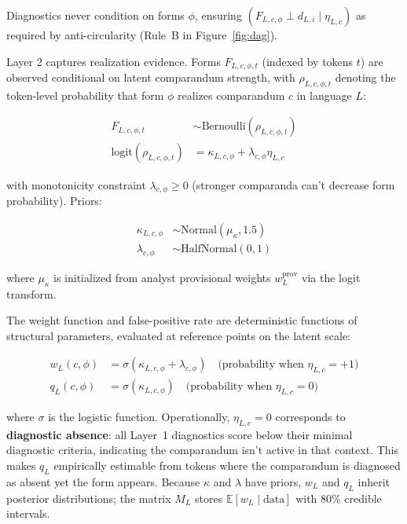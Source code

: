 \documentclass[12pt]{article}
\begin{document}
Diagnostics never condition on forms $\phi$, ensuring $(F_{L,c,\phi} \perp d_{L,i} \mid \eta_{L,c})$ as required by anti-circularity (Rule~B in Figure~\ref{fig:dag}).

Layer 2 captures realization evidence. Forms $F_{L,c,\phi,t}$ (indexed by tokens $t$) are observed conditional on latent comparandum strength, with $\rho_{L,c,\phi,t}$ denoting the token-level probability that form $\phi$ realizes comparandum $c$ in language $L$:

\begin{align}
F_{L,c,\phi,t} &\sim \text{Bernoulli}(\rho_{L,c,\phi,t}) \\
\text{logit}(\rho_{L,c,\phi,t}) &= \kappa_{L,c,\phi} + \lambda_{c,\phi} \eta_{L,c}
\end{align}

with monotonicity constraint $\lambda_{c,\phi} \geq 0$ (stronger comparanda can't decrease form probability). Priors:

\begin{align}
\kappa_{L,c,\phi} &\sim \text{Normal}(\mu_{\kappa}, 1.5) \\
\lambda_{c,\phi} &\sim \text{HalfNormal}(0, 1)
\end{align}

where $\mu_{\kappa}$ is initialized from analyst provisional weights $w_L^{\text{prov}}$ via the logit transform.

The weight function and false-positive rate are deterministic functions of structural parameters, evaluated at reference points on the latent scale:

\begin{align}
w_L(c,\phi) &= \sigma(\kappa_{L,c,\phi} + \lambda_{c,\phi}) \quad \text{(probability when $\eta_{L,c}=+1$)} \\
q_L(c,\phi) &= \sigma(\kappa_{L,c,\phi}) \quad \text{(probability when $\eta_{L,c}=0$)}
\end{align}

where $\sigma$ is the logistic function. Operationally, $\eta_{L,c}=0$ corresponds to \textbf{diagnostic absence}: all Layer~1 diagnostics score below their minimal diagnostic criteria, indicating the comparandum isn't active in that context. This makes $q_L$ empirically estimable from tokens where the comparandum is diagnosed as absent yet the form appears. Because $\kappa$ and $\lambda$ have priors, $w_L$ and $q_L$ inherit posterior distributions; the matrix $M_L$ stores $\mathbb{E}[w_L \mid \text{data}]$ with 80\% credible intervals.
\end{document}
